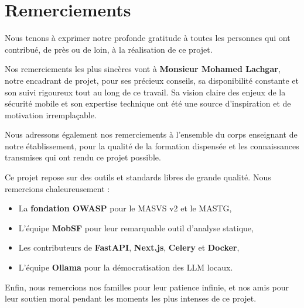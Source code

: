 \chapter*{Remerciements}
\thispagestyle{fancy}

Nous tenons à exprimer notre profonde gratitude à toutes les personnes qui ont contribué,
de près ou de loin, à la réalisation de ce projet.

\begin{tcolorbox}[infobox, title={\faHeart\quad Encadrement}]
Nos remerciements les plus sincères vont à \textbf{Monsieur Mohamed Lachgar}, notre encadrant
de projet, pour ses précieux conseils, sa disponibilité constante et son suivi rigoureux
tout au long de ce travail. Sa vision claire des enjeux de la sécurité mobile et son
expertise technique ont été une source d'inspiration et de motivation irremplaçable.
\end{tcolorbox}

\vspace{0.5cm}

\begin{tcolorbox}[infobox, title={\faUniversity\quad Corps enseignant}]
Nous adressons également nos remerciements à l'ensemble du corps enseignant de notre
établissement, pour la qualité de la formation dispensée et les connaissances transmises
qui ont rendu ce projet possible.
\end{tcolorbox}

\vspace{0.5cm}

\begin{tcolorbox}[successbox, title={\faUsers\quad Communautés Open Source}]
Ce projet repose sur des outils et standards libres de grande qualité. Nous remercions
chaleureusement :
\begin{itemize}[leftmargin=1.5em]
  \item La \textbf{fondation OWASP} pour le MASVS v2 et le MASTG,
  \item L'équipe \textbf{MobSF} pour leur remarquable outil d'analyse statique,
  \item Les contributeurs de \textbf{FastAPI}, \textbf{Next.js}, \textbf{Celery} et \textbf{Docker},
  \item L'équipe \textbf{Ollama} pour la démocratisation des LLM locaux.
\end{itemize}
\end{tcolorbox}

\vspace{0.5cm}

Enfin, nous remercions nos familles pour leur patience infinie, et nos amis pour leur
soutien moral pendant les moments les plus intenses de ce projet.

\cleardoublepage
